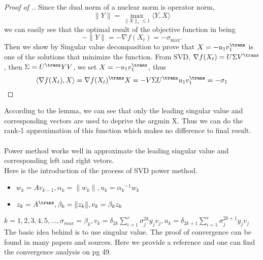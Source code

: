 \begin{proof} [Proof of .]
Since the dual norm of a nuclear norm is operator norm,
\[
\|Y\| = \max_{\|X\|_*\leq 1}\langle Y, X\rangle
\]we can easily see that the optimal result of the objective function in  being
\[
-\|Y\| = -\nabla f(X_t)=-\sigma_{\max}.
\]
Then we show by Singular value decompasition to prove that $X = -u_1v_1^\trans$ is one of the solutions that minimize the function.
From SVD, $\nabla f(X_t) = U\Sigma V^\trans $, then $\Sigma = U^\trans YV$, we set $X=-u_1v_1^\trans$, thus
\[
\langle\nabla f(X_t), X\rangle = \nabla f(X_t)^\trans X = -V\Sigma U^\trans u_1v_1^\trans= -\sigma_1
\]
\end{proof}
According to the lemma, we can see that only the leading singular value and corresponding vectors are used to deprive the argmin X. Thus we can do the rank-1 approximation of this function which makes no difference to final result.\\ \\
Power method works well in approximate the leading singular value and corresponding left and right vetors.\\
Here is the introduction of the process of SVD power method.
\begin{itemize}
\item $w_k=Av_{k-1}, \alpha_k=\|w_k\|, u_k={\alpha_k}^{-1}w_k$
\item $z_k=A^\trans, \beta_k = \|z_k\|, v_k=\beta_kz_k$
\end{itemize}
$k=1, 2, 3, 4, 5,... , \sigma_{max}=\beta_k, v_k=\delta_{2k}\sum\limits_{i=1}^r \sigma_j ^{2k}y_jv_j, u_k=\delta_{2k+1}\sum\limits_{i=1}^r \sigma_j ^{2k+1}y_jv_j$\\
The basic idea behind is to use singular value. The proof of convergence can be found in many papers and sources. Here we provide a reference \cite{Bentbib2015} and one can find the convergence analysis on pg 49.